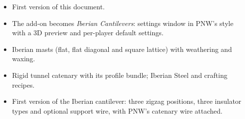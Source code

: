\documentclass[11pt,a4paper]{article}
\begin{document}
\begin{small}
\begin{description}[style=nextline,leftmargin=0pt]
\begin{itemize}
    \item First version of this document.
  \end{itemize}
  \item[2 October 2026]
  \begin{itemize}
    \item The add-on becomes \emph{Iberian Cantilevers}: settings window in PNW's style with a 3D preview and
          per-player default settings.
    \item Iberian masts (flat, flat diagonal and square lattice) with weathering and waxing.
    \item Rigid tunnel catenary with its profile bundle; Iberian Steel and crafting recipes.
  \end{itemize}
  \item[1 October 2026]
  \begin{itemize}
    \item First version of the Iberian cantilever: three zigzag positions, three insulator types and optional
          support wire, with PNW's catenary wire attached.
  \end{itemize}
\end{description}
\end{small}
\end{document}
